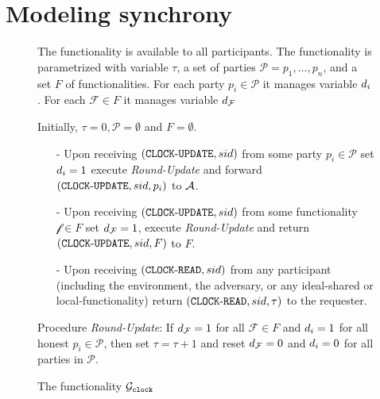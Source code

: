 \section{Modeling synchrony}
\begin{figure}[!h]
\setlength{\fboxsep}{12pt}
\begin{center}
\begin{boxedminipage}{12cm}
The functionality is available to all participants. The functionality is parametrized with variable $\tau$, a set of parties $\mathcal{P}={p_1,\dots, p_n}$, and a set $F$ of functionalities.
 For each party $p_i\in\mathcal{P}$ it manages variable $d_i$. For each $\mathcal{F}\in F$ 
it manages variable $d_\mathcal{F}$

Initially, $\tau=0, \mathcal{P}=\emptyset$ and $F=\emptyset$.

\begin{itemize}
\item[-] Upon receiving $(\mathtt{CLOCK\text{-}UPDATE},sid)$ from some party $p_i\in\mathcal{P}$ set $d_i=1$ 
execute \emph{Round-Update} and forward $(\mathtt{CLOCK\text{-}UPDATE}, sid , p_i)$ to $\mathcal{A}$.
\item[-] Upon receiving $(\mathtt{CLOCK\text{-}UPDATE}, sid)$ from some functionality $\mathcal{f}\in F$ set $d_\mathcal{F}=1$, execute \emph{Round-Update} and return $(\mathtt{CLOCK\text{-}UPDATE}, sid , F)$ to $F$.
\item[-] Upon receiving $(\mathtt{CLOCK\text{-}READ}, sid)$ from any participant (including the environment, the adversary, or any ideal-shared or local-functionality) return $(\mathtt{CLOCK\text{-}READ}, sid, \tau)$ to the requester.
\end{itemize}

Procedure \emph{Round-Update}:
If $d_\mathcal{F}=1$ for all $\mathcal{F}\in F$ and $d_i =1$ for all honest $p_i\in\mathcal{P}$, 
then set $\tau=\tau+1$ and reset $d_\mathcal{F}=0$ and $d_i=0$ for all parties in $\mathcal{P}$.

\end{boxedminipage}
\end{center}
\caption{The functionality $\mathcal{G}_{\mathtt{clock}}$} 
\label{fig:gclock}
\end{figure}
